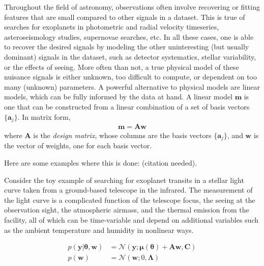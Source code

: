\documentclass{rnaastex}
\newcommand{\bvec}[1]{{\ensuremath{\boldsymbol{#1}}}}
\newcommand{\citeme}{{\color{red}(citation needed)}}
\begin{document}
Throughout the field of astronomy, observations often involve recovering or 
fitting features that are small compared to other signals in a dataset. 
This is true of searches for exoplanets in photometric and radial velocity 
timeseries, asteroseismology studies, supernovae searches, etc. 
In all these cases, one is able to recover the desired signals by modeling the 
other uninteresting (but usually dominant) signals in the dataset, such as 
detector systematics, stellar variability, or the effects of seeing. 
More often than not, a true physical model of these nuisance signals is 
either unknown, too difficult to compute, or dependent on too many (unknown) 
parameters. 
A powerful alternative to physical models are linear models, which can be 
fully informed by the data at hand. A linear model $\bvec{m}$ is one that can 
be constructed from a linear combination of a set of basis vectors 
$\{\bvec{a}_j\}$. In matrix form,
%
\begin{align}
\bvec{m} = \bvec{A} \bvec{w}
\end{align}
%
where $\bvec{A}$ is the \emph{design matrix}, whose columns are the basis 
vectors $\{\bvec{a}_j\}$, and $\bvec{w}$ is the vector of weights, one 
for each basis vector.

Here are some examples where this is done: \citeme. 
\citep{Luger:2017,Luger:2016}

Consider the toy example of searching for exoplanet transits in a stellar 
light curve taken from a ground-based telescope in the infrared. 
The measurement of the light curve is a complicated function of the telescope 
focus, the seeing at the observation sight, the atmospheric airmass, and the 
thermal emission from the facility, all of which can be time-variable and 
depend on additional variables such as the ambient temperature and humidity 
in nonlinear ways.

\begin{align}
p(\bvec{y} | \bvec{\theta}, \bvec{w}) &= 
    \mathcal{N}(\bvec{y}; 
                \bvec{\mu}(\bvec{\theta}) + \bvec{A}\bvec{w}, 
                \bvec{C}) 
                \nonumber\\
%
p(\bvec{w}) &= \mathcal{N}(\bvec{w}; 0, \bvec{\Lambda}) \nonumber
\end{align}
\end{document}
